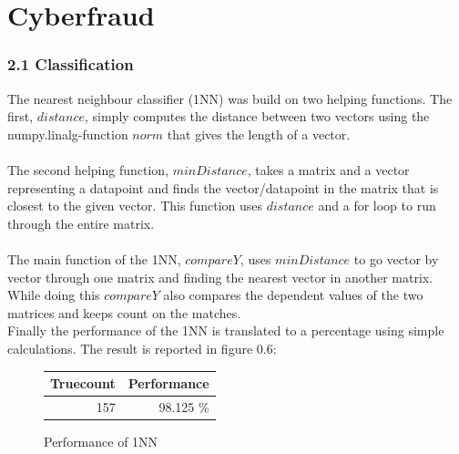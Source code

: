 \documentclass[a4paper,danish,8pt,oneside,openany]{memoir}
\begin{document}
\section*{Cyberfraud}
\subsubsection*{2.1 Classification}
The nearest neighbour classifier (1NN) was build on two helping functions. The first, $distance$, simply computes the distance between two vectors using the numpy.linalg-function $norm$ that gives the length of a vector.\\
\\
The second helping function, $minDistance$, takes a matrix and a vector representing a datapoint and finds the vector/datapoint in the matrix that is closest to the given vector. This function uses $distance$ and a for loop to run through the entire matrix.
\\
\\
The main function of the 1NN, $compareY$, uses $minDistance$ to go vector by vector through one matrix and finding the nearest vector in another matrix. While doing this $compareY$ also compares the dependent values of the two matrices and keeps count on the matches.\\
Finally the performance of the 1NN is translated to a percentage using simple calculations. The result is reported in figure 0.6:
\\
\begin{figure}[!h]
\centering
\begin{tabular}{|r|r|}
\hline
\textbf{Truecount} & \textbf{Performance}\\ \hline
157 & 98.125 \%  \\ \hline
\end{tabular}
\caption{Performance of 1NN}
\end{figure}
%
\end{document}
